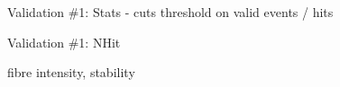 \documentclass[xcolor=table]{beamer}
\begin{document}
\begin{frame}{Validation \#1: Stats - cuts}
\noindent{}
\center threshold on valid events / hits
\end{frame}

\begin{frame}{Validation \#1: NHit}
\begin{minipage}{0.5\textwidth}
\noindent{}
\end{minipage}%
\begin{minipage}{0.5\textwidth}
\noindent{}
\end{minipage}
\center fibre intensity, stability
\end{frame}
\end{document}
